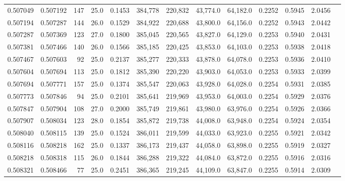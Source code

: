 \begin{tabular}{rrrrrrrrrrrrr}
0.507049 & 0.507192 &   147 & 25.0 &                                     0.1453 & 384,778 & 220,832 &  43,774.0 &  64,182.0 & 0.2252 & 0.5945 & 2.0456 \\
0.507194 & 0.507287 &   144 & 26.0 &                                     0.1529 & 384,922 & 220,688 &  43,800.0 &  64,156.0 & 0.2252 & 0.5943 & 2.0442 \\
0.507287 & 0.507369 &   123 & 27.0 &                                     0.1800 & 385,045 & 220,565 &  43,827.0 &  64,129.0 & 0.2253 & 0.5940 & 2.0431 \\
0.507381 & 0.507466 &   140 & 26.0 &                                     0.1566 & 385,185 & 220,425 &  43,853.0 &  64,103.0 & 0.2253 & 0.5938 & 2.0418 \\
0.507467 & 0.507603 &    92 & 25.0 &                                     0.2137 & 385,277 & 220,333 &  43,878.0 &  64,078.0 & 0.2253 & 0.5936 & 2.0410 \\
0.507604 & 0.507694 &   113 & 25.0 &                                     0.1812 & 385,390 & 220,220 &  43,903.0 &  64,053.0 & 0.2253 & 0.5933 & 2.0399 \\
0.507694 & 0.507771 &   157 & 25.0 &                                     0.1374 & 385,547 & 220,063 &  43,928.0 &  64,028.0 & 0.2254 & 0.5931 & 2.0385 \\
0.507773 & 0.507846 &    94 & 25.0 &                                     0.2101 & 385,641 & 219,969 &  43,953.0 &  64,003.0 & 0.2254 & 0.5929 & 2.0376 \\
0.507847 & 0.507904 &   108 & 27.0 &                                     0.2000 & 385,749 & 219,861 &  43,980.0 &  63,976.0 & 0.2254 & 0.5926 & 2.0366 \\
0.507907 & 0.508034 &   123 & 28.0 &                                     0.1854 & 385,872 & 219,738 &  44,008.0 &  63,948.0 & 0.2254 & 0.5924 & 2.0354 \\
0.508040 & 0.508115 &   139 & 25.0 &                                     0.1524 & 386,011 & 219,599 &  44,033.0 &  63,923.0 & 0.2255 & 0.5921 & 2.0342 \\
0.508116 & 0.508218 &   162 & 25.0 &                                     0.1337 & 386,173 & 219,437 &  44,058.0 &  63,898.0 & 0.2255 & 0.5919 & 2.0327 \\
0.508218 & 0.508318 &   115 & 26.0 &                                     0.1844 & 386,288 & 219,322 &  44,084.0 &  63,872.0 & 0.2255 & 0.5916 & 2.0316 \\
0.508321 & 0.508466 &    77 & 25.0 &                                     0.2451 & 386,365 & 219,245 &  44,109.0 &  63,847.0 & 0.2255 & 0.5914 & 2.0309 \\

\end{tabular}
